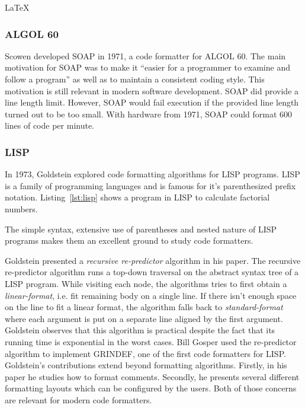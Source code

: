 LaTeX


\subsubsection{ALGOL 60}
Scowen\autocite{scowen_soapprogram_1971} developed SOAP in 1971, a code formatter for ALGOL 60.
The main motivation for SOAP was to make it ``easier for a programmer to examine and follow a program'' as well as to maintain a consistent coding style.
This motivation is still relevant in modern software development.
SOAP did provide a line length limit.
However, SOAP would fail execution if the provided line length turned out to be too small.
With hardware from 1971, SOAP could format 600 lines of code per minute.

\subsubsection{LISP}
In 1973, Goldstein\autocite{goldstein_pretty-printing_1973} explored code formatting algorithms for LISP\autocite{mccarthy_recursive_1960} programs.
LISP is a family of programming languages and is famous for it's parenthesized prefix notation.
Listing~\ref{lst:lisp} shows a program in LISP to calculate factorial numbers.

The simple syntax, extensive use of parentheses and nested nature of LISP programs makes them an excellent ground to study code formatters.

Goldstein presented a \emph{recursive re-predictor} algorithm in his paper.
The recursive re-predictor algorithm runs a top-down traversal on the abstract syntax tree of a LISP program.
While visiting each node, the algorithms tries to first obtain a \emph{linear-format}, i.e. fit remaining body on a single line.
If there isn't enough space on the line to fit a linear format, the algorithm falls back to \emph{standard-format} where each argument is put on a separate line aligned by the first argument.
Goldstein observes that this algorithm is practical despite the fact that its running time is exponential in the worst cases.
Bill Gosper used the re-predictor algorithm to implement GRINDEF\autocite{_bill_????}, one of the first code formatters for LISP.
Goldstein's contributions extend beyond formatting algorithms.
Firstly, in his paper he studies how to format comments.
Secondly, he presents several different formatting layouts which can be configured by the users.
Both of those concerns are relevant for modern code formatters.

